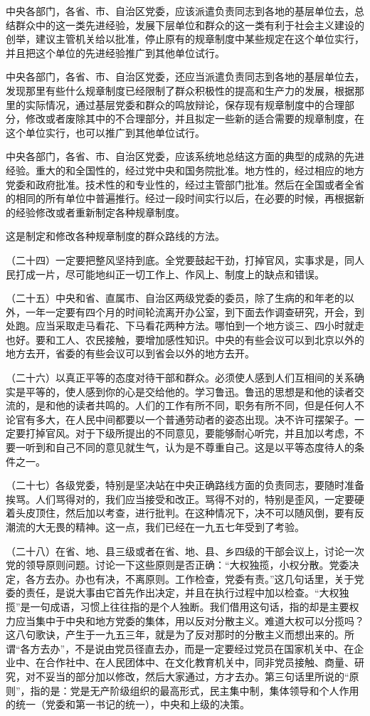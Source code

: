 中央各部门，各省、市、自治区党委，应该派遣负责同志到各地的基层单位去，总结群众中的这一类先进经验，发展下层单位和群众的这一类有利于社会主义建设的创举，建议主管机关给以批准，停止原有的规章制度中某些规定在这个单位实行，并且把这个单位的先进经验推广到其他单位试行。

中央各部门，各省、市、自治区党委，还应当派遣负责同志到各地的基层单位去，发现那里有些什么规章制度已经限制了群众积极性的提高和生产力的发展，根据那里的实际情况，通过基层党委和群众的鸣放辩论，保存现有规章制度中的合理部分，修改或者废除其中的不合理部分，并且拟定一些新的适合需要的规章制度，在这个单位实行，也可以推广到其他单位试行。

中央各部门，各省、市、自治区党委，应该系统地总结这方面的典型的成熟的先进经验。重大的和全国性的，经过党中央和国务院批准。地方性的，经过相应的地方党委和政府批准。技术性的和专业性的，经过主管部门批准。然后在全国或者全省的相同的所有单位中普遍推行。经过一段时间实行以后，在必要的时候，再根据新的经验修改或者重新制定各种规章制度。

这是制定和修改各种规章制度的群众路线的方法。

（二十四）一定要把整风坚持到底。全党要鼓起干劲，打掉官风，实事求是，同人民打成一片，尽可能地纠正一切工作上、作风上、制度上的缺点和错误。

（二十五）中央和省、直属市、自治区两级党委的委员，除了生病的和年老的以外，一年一定要有四个月的时间轮流离开办公室，到下面去作调查研究，开会，到处跑。应当采取走马看花、下马看花两种方法。哪怕到一个地方谈三、四小时就走也好。要和工人、农民接触，要增加感性知识。中央的有些会议可以到北京以外的地方去开，省委的有些会议可以到省会以外的地方去开。

（二十六）以真正平等的态度对待干部和群众。必须使人感到人们互相间的关系确实是平等的，使人感到你的心是交给他的。学习鲁迅。鲁迅的思想是和他的读者交流的，是和他的读者共鸣的。人们的工作有所不同，职务有所不同，但是任何人不论官有多大，在人民中间都要以一个普通劳动者的姿态出现。决不许可摆架子。一定要打掉官风。对于下级所提出的不同意见，要能够耐心听完，并且加以考虑，不要一听到和自己不同的意见就生气，认为是不尊重自己。这是以平等态度待人的条件之一。

（二十七）各级党委，特别是坚决站在中央正确路线方面的负责同志，要随时准备挨骂。人们骂得对的，我们应当接受和改正。骂得不对的，特别是歪风，一定要硬着头皮顶住，然后加以考查，进行批判。在这种情况下，决不可以随风倒，要有反潮流的大无畏的精神。这一点，我们已经在一九五七年受到了考验。

（二十八）在省、地、县三级或者在省、地、县、乡四级的干部会议上，讨论一次党的领导原则问题。讨论一下这些原则是否正确：“大权独揽，小权分散。党委决定，各方去办。办也有决，不离原则。工作检查，党委有责。”这几句话里，关于党委的责任，是说大事由它首先作出决定，并且在执行过程中加以检查。“大权独揽”是一句成语，习惯上往往指的是个人独断。我们借用这句话，指的却是主要权力应当集中于中央和地方党委的集体，用以反对分散主义。难道大权可以分揽吗？这八句歌诀，产生于一九五三年，就是为了反对那时的分散主义而想出来的。所谓“各方去办”，不是说由党员径直去办，而是一定要经过党员在国家机关中、在企业中、在合作社中、在人民团体中、在文化教育机关中，同非党员接触、商量、研究，对不妥当的部分加以修改，然后大家通过，方才去办。第三句话里所说的“原则”，指的是：党是无产阶级组织的最高形式，民主集中制，集体领导和个人作用的统一（党委和第一书记的统一），中央和上级的决策。

